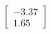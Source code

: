 \documentclass[preview]{standalone}
\begin{document}
\begin{align*}
\begin{bmatrix} -3.37 \\ 1.65 \end{bmatrix}
\end{align*}
\end{document}
